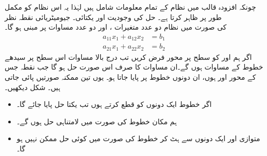چونکہ افزودہ قالب میں نظام  کے تمام معلومات شامل ہیں لہٰذا یہ اس نظام کو مکمل طور پر ظاہر کرتا ہے۔
\quad حل کی وجودیت اور یکتائی۔ جیومیٹریائی نقطہ نظر\\
 کی صورت میں نظام دو عدد متغیرات ،  اور دو عدد مساوات پر مبنی ہو گا۔
\begin{align*}
a_{11}x_1+a_{12}x_2&=b_1\\
a_{21}x_1+a_{22}x_2&=b_2
\end{align*}
اگر ہم  اور   کو سطح  پر محور فرض کریں تب درج بالا مساوات اس سطح پر سیدھے خطوط کے مساوات ہوں گے۔ان مساوات کا صرف اس صورت حل  ہو گا جب نقطہ  جس کے محور  اور  ہوں، ان دونوں خطوط پر پایا جاتا ہو۔ یوں تین ممکنہ صورتیں پائی جاتی ہیں۔ شکل  دیکھیں۔
\begin{itemize}
\item
اگر خطوط ایک دونوں کو قطع کرتے ہوں تب یکتا حل پایا جائے گا۔
\item
ہم مکان خطوط کی صورت میں لامتناہی حل ہوں گے۔
\item
متوازی اور ایک دونوں سے ہٹ کر خطوط کی صورت میں کوئی حل ممکن نہیں ہو گا۔
\end{itemize}
%
